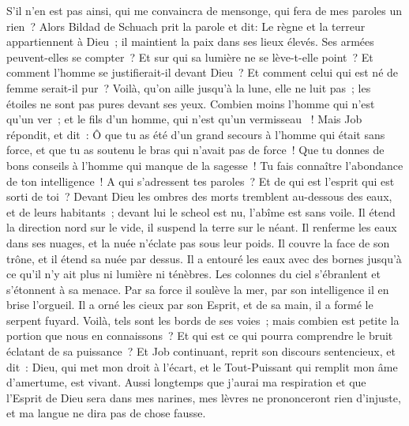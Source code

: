 \begin{multicols}{2}
S'il n'en est pas ainsi, qui me convaincra de mensonge, qui fera de mes paroles un rien~?
\VerseOne{}Alors Bildad de Schuach prit la parole et dit: 
Le règne et la terreur appartiennent à Dieu~; il maintient la paix dans ses lieux élevés.
 Ses armées peuvent-elles se compter~? Et sur qui sa lumière ne se lève-t-elle point~?
Et comment l'homme se justifierait-il devant Dieu~? Et comment celui qui est né de femme serait-il pur~?
Voilà, qu'on aille jusqu'à la lune, elle ne luit pas~; les étoiles ne sont pas pures devant ses yeux.
Combien moins l'homme qui n'est qu'un ver~; et le fils d'un homme, qui n'est qu'un vermisseau ~!
\VerseOne{}Mais Job répondit, et dit~:
Ô que tu as été d'un grand secours à l'homme qui était sans force, et que tu as soutenu le bras qui n'avait pas de force~!
Que tu donnes de bons conseils à l'homme qui manque de la sagesse~! Tu fais connaître l'abondance de ton intelligence~!
A qui s'adressent tes paroles~? Et de qui est l'esprit qui est sorti de toi~?
Devant Dieu les ombres des morts tremblent au-dessous des eaux, et de leurs habitants~;
devant lui le scheol est nu, l'abîme est sans voile.
Il étend la direction nord sur le vide, il suspend la terre sur le néant.
Il renferme les eaux dans ses nuages, et la nuée n'éclate pas sous leur poids.
Il couvre la face de son trône, et il étend sa nuée par dessus.
Il a entouré les eaux avec des bornes jusqu'à ce qu'il n'y ait plus ni lumière ni ténèbres.
Les colonnes du ciel s'ébranlent et s'étonnent à sa menace.
Par sa force il soulève la mer, par son intelligence il en brise l'orgueil.
Il a orné les cieux par son Esprit, et de sa main, il a formé le serpent fuyard.
Voilà, tels sont les bords de ses voies~; mais combien est petite la portion que nous en connaissons~? Et qui est ce qui pourra comprendre le bruit éclatant de sa puissance~?
\VerseOne{}Et Job continuant, reprit son discours sentencieux, et dit~:
Dieu, qui met mon droit à l'écart, et le Tout-Puissant qui remplit mon âme d'amertume, est vivant.
Aussi longtemps que j'aurai ma respiration et que l'Esprit de Dieu sera dans mes narines,
mes lèvres ne prononceront rien d'injuste, et ma langue ne dira pas de chose fausse.

\end{multicols}
